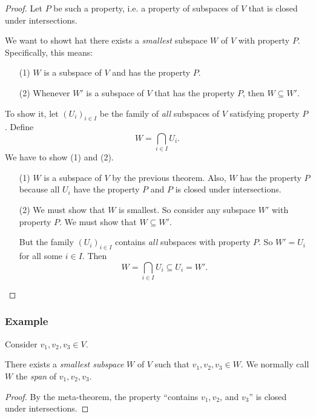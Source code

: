\documentclass[11pt]{article}
\begin{document}
    \begin{proof}
        Let $P$ be such a property, i.e. a property of subspaces of $V$ that is closed under intersections.

        We want to showt hat there exists a \emph{smallest} subspace $W$ of $V$ with property $P$. Specifically, this means:
        \begin{enumerate}
            \item[(1)] $W$ is a subspace of $V$ and has the property $P$.
            \item[(2)] Whenever $W'$ is a subspace of $V$ that has the property $P$, then $W \subseteq W'$.  
        \end{enumerate}

        To show it, let \((U_i)_{i \in I}\) be the family of \emph{all} subspaces of $V$ satisfying property $P$. Define \[W = \bigcap_{i \in I} U_i. \] We have to show (1) and (2).

        \begin{enumerate}
            \item[(1)] $W$ is a subspace of $V$ by the previous theorem. Also, $W$ has the property $P$ because all $U_i$ have the property $P$ and $P$ is closed under intersections.
            \item[(2)] We must show that $W$ is smallest. So consider any subspace $W'$ with property $P$. We must show that \(W \subseteq W'\).
            
            But the family \((U_i)_{i \in I}\) contains \emph{all} subspaces with property $P$. So \(W' = U_i\) for all some \(i \in I\). Then \[W = \bigcap_{i \in I} U_i \subseteq U_i = W'.\]
        \end{enumerate}
    \end{proof}

    \subsubsection{Example}
    
    Consider \(v_1, v_2, v_3 \in V\).

    There exists a \emph{smallest subspace} $W$ of $V$ such that \(v_1, v_2, v_3 \in W\). We normally call $W$ the \emph{span} of \(v_1, v_2, v_3\).

    \begin{proof}
        By the meta-theorem, the property ``contains \(v_1, v_2\), and \(v_3\)'' is closed under intersections.
    \end{proof}
    
\end{document}
